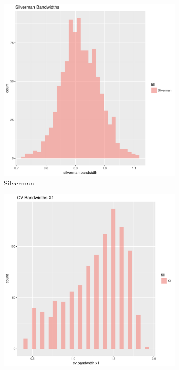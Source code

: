 \begin{figure}[htbp]
    \centering
    \begin{subfigure}[b]{0.3\textwidth}
    \includegraphics[width=\textwidth]{results/unif_100_1.0_1h/output/bandwidths-silverman}
    \caption{Silverman}
    \label{fig:bandwidths_x1:unif_100_1.0_1h:s}
    \end{subfigure}
    \begin{subfigure}[b]{0.3\textwidth}
    \includegraphics[width=\textwidth]{results/unif_100_1.0_1h/output/bandwidths-x1}

\end{subfigure}
\end{figure}
